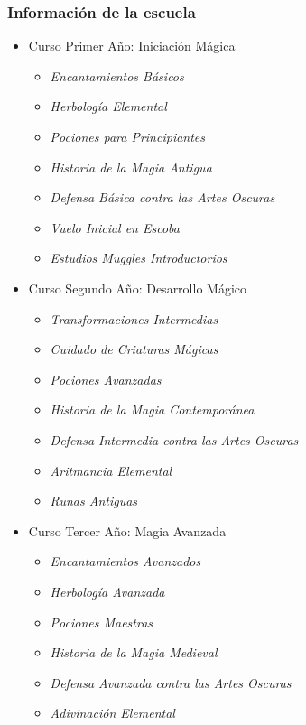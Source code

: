 \subsubsection*{Información de la escuela}

\begin{itemize}
  \item Curso Primer Año:  Iniciación Mágica
    \begin{itemize}
      \item \textit{Encantamientos Básicos}
      \item \textit{Herbología Elemental}
      \item \textit{Pociones para Principiantes}
      \item \textit{Historia de la Magia Antigua}
      \item \textit{Defensa Básica contra las Artes Oscuras}
      \item \textit{Vuelo Inicial en Escoba}
      \item \textit{Estudios Muggles Introductorios}
    \end{itemize}
  \item Curso Segundo Año: Desarrollo Mágico
    \begin{itemize}
      \item \textit{Transformaciones Intermedias}
      \item \textit{Cuidado de Criaturas Mágicas}
      \item \textit{Pociones Avanzadas}
      \item \textit{Historia de la Magia Contemporánea}
      \item \textit{Defensa Intermedia contra las Artes Oscuras}
      \item \textit{Aritmancia Elemental}
      \item \textit{Runas Antiguas}
    \end{itemize}
  \item Curso Tercer Año:  Magia Avanzada
    \begin{itemize}
      \item \textit{Encantamientos Avanzados}
      \item \textit{Herbología Avanzada}
      \item \textit{Pociones Maestras}
      \item \textit{Historia de la Magia Medieval}
      \item \textit{Defensa Avanzada contra las Artes Oscuras}
      \item \textit{Adivinación Elemental}

\end{itemize}
\end{itemize}
